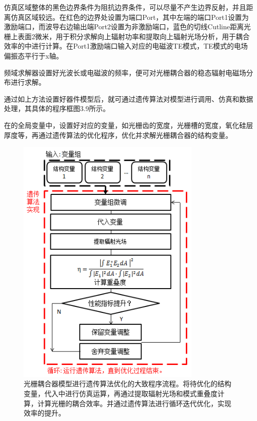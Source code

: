 仿真区域整体的黑色边界条件为阻抗边界条件，可以尽量不产生边界反射，并且距离仿真区域较远。在红色的边界处设置为端口Port，其中左端的端口Port1设置为激励端口，而波导右边输出端Port2设置为非激励端口，蓝色的切线Cutline距离光栅上表面2微米，用于积分求解向上辐射功率和提取向上辐射光场分析，用于耦合效率的中进行计算。在Port1激励端口输入对应的电磁波TE模式，TE模式的电场偏振态平行于x轴。

频域求解器设置好光波长或电磁波的频率，便可对光栅耦合器的稳态辐射电磁场分布进行求解。

通过如上方法设置好器件模型后，就可通过遗传算法对模型进行调用、仿真和数据处理，其具体的程序框图3.9所示。

在的全局变量中，设置好对应的变量，如光栅齿的宽度，光栅槽的宽度，氧化硅层厚度等，再通过遗传算法的优化程序，优化并求解光栅耦合器的结构变量。

\begin{figure}[!htbp]
    \centering
    \includegraphics[width=0.8\textwidth]{Img/3-9.png}
    \caption{光栅耦合器模型进行遗传算法优化的大致程序流程。将待优化的结构变量，代入中进行仿真运算，再通过提取辐射光场和模式重叠度计算，计算光栅的耦合效率。并通过遗传算法进行循环迭代优化，实现效率的提升。}
    \label{fig:3-9}
\end{figure}

